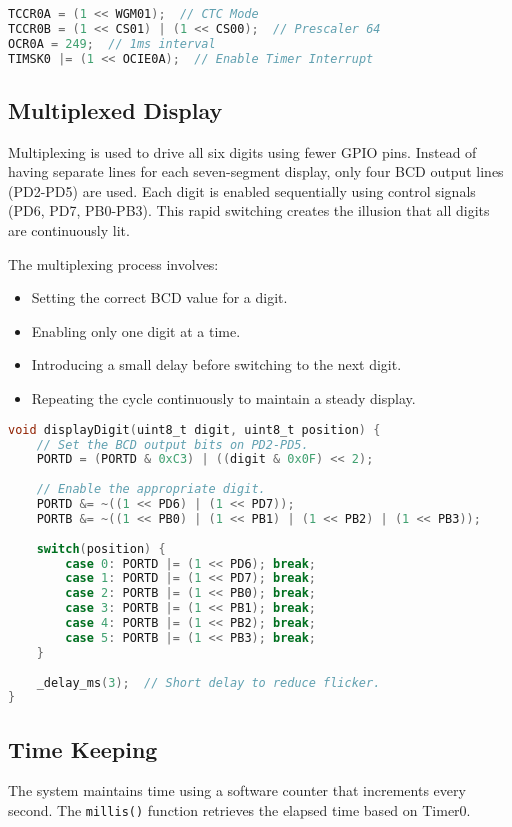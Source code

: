 \documentclass{article}
\begin{document}
\begin{lstlisting}[language=C, caption=Timer0 Configuration]
TCCR0A = (1 << WGM01);  // CTC Mode
TCCR0B = (1 << CS01) | (1 << CS00);  // Prescaler 64
OCR0A = 249;  // 1ms interval
TIMSK0 |= (1 << OCIE0A);  // Enable Timer Interrupt
\end{lstlisting}

\subsection{Multiplexed Display}
Multiplexing is used to drive all six digits using fewer GPIO pins. Instead of having separate lines for each seven-segment display, only four BCD output lines (PD2-PD5) are used. Each digit is enabled sequentially using control signals (PD6, PD7, PB0-PB3). This rapid switching creates the illusion that all digits are continuously lit.

The multiplexing process involves:
\begin{itemize}
\item Setting the correct BCD value for a digit.
\item Enabling only one digit at a time.
\item Introducing a small delay before switching to the next digit.
\item Repeating the cycle continuously to maintain a steady display.
\end{itemize}

\begin{lstlisting}[language=C, caption=Digit Multiplexing]
void displayDigit(uint8_t digit, uint8_t position) {
    // Set the BCD output bits on PD2-PD5.
    PORTD = (PORTD & 0xC3) | ((digit & 0x0F) << 2);
    
    // Enable the appropriate digit.
    PORTD &= ~((1 << PD6) | (1 << PD7));
    PORTB &= ~((1 << PB0) | (1 << PB1) | (1 << PB2) | (1 << PB3));
    
    switch(position) {
        case 0: PORTD |= (1 << PD6); break;
        case 1: PORTD |= (1 << PD7); break;
        case 2: PORTB |= (1 << PB0); break;
        case 3: PORTB |= (1 << PB1); break;
        case 4: PORTB |= (1 << PB2); break;
        case 5: PORTB |= (1 << PB3); break;
    }
    
    _delay_ms(3);  // Short delay to reduce flicker.
}
\end{lstlisting}

\subsection{Time Keeping}
The system maintains time using a software counter that increments every second. The \texttt{millis()} function retrieves the elapsed time based on Timer0.
\end{document}

